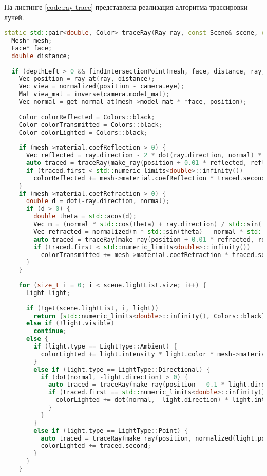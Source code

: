 На листинге \ref{code:ray-trace} представлена реализация алгоритма трассировки лучей.

\begin{lstlisting}[language=C++,label=code:ray-trace,caption=Реализация алгоритма трассировки лучей]
static std::pair<double, Color> traceRay(Ray ray, const Scene& scene, const Camera& camera, int depthLeft) {
  Mesh* mesh;
  Face* face;
  double distance;
  
  if (depthLeft > 0 && findIntersectionPoint(mesh, face, distance, ray, scene)) {
    Vec position = ray_at(ray, distance);
    Vec view = normalized(position - camera.eye);
    Mat view_mat = inverse(camera.model_mat);
    Vec normal = get_normal_at(mesh->model_mat * *face, position);
    
    Color colorReflected = Colors::black;
    Color colorTransmitted = Colors::black;
    Color colorLighted = Colors::black;
    
    if (mesh->material.coefReflection > 0) {
      Vec reflected = ray.direction - 2 * dot(ray.direction, normal) * normal;
      auto traced = traceRay(make_ray(position + 0.01 * reflected, reflected), scene, camera, depthLeft - 1);
      if (traced.first < std::numeric_limits<double>::infinity())
        colorReflected += mesh->material.coefReflection * traced.second;
    }
    if (mesh->material.coefRefraction > 0) {
      double d = dot(-ray.direction, normal);
      if (d > 0) {
        double theta = std::acos(d);
        Vec m = (normal * std::cos(theta) + ray.direction) / std::sin(theta);
        Vec refracted = normalized(m * std::sin(theta) - normal * std::cos(theta));
        auto traced = traceRay(make_ray(position + 0.01 * refracted, refracted), scene, camera, depthLeft - 1);
        if (traced.first < std::numeric_limits<double>::infinity())
          colorTransmitted += mesh->material.coefRefraction * traced.second;
      }
    }
    
    for (size_t i = 0; i < scene.lightList.size; i++) {
      Light light;
  
      if (!get(scene.lightList, i, light))
        return {std::numeric_limits<double>::infinity(), Colors::black};
      else if (!light.visible)
        continue;
      else {
        if (light.type == LightType::Ambient) {
          colorLighted += light.intensity * light.color * mesh->material.ambientColor;
        }
        else if (light.type == LightType::Directional) {
          if (dot(normal, -light.direction) > 0) {
            auto traced = traceRay(make_ray(position - 0.1 * light.direction, -light.direction), scene, camera, depthLeft - 1);
            if (traced.first == std::numeric_limits<double>::infinity()) {
              colorLighted += dot(normal, -light.direction) * light.intensity * light.color;
            }
          }
        }
        else if (light.type == LightType::Point) {
          auto traced = traceRay(make_ray(position, normalized(light.position - position)), scene, camera, depthLeft - 1);
          colorLighted += traced.second;
        }
      }
    }
    

\end{lstlisting}
